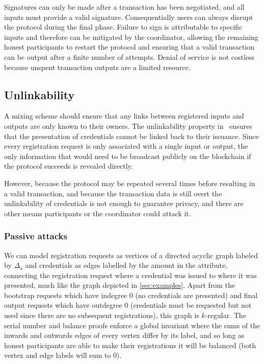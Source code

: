 \documentclass[a4paper]{article}
\begin{document}
Signatures can only be made after a transaction has been negotiated, and all inputs must provide a valid signature. Consequentially users can always disrupt the protocol during the final phase. Failure to sign is attributable to specific inputs and therefore can be mitigated by the coordinator, allowing the remaining honest participants to restart the protocol and ensuring that a valid transaction can be output after a finite number of attempts. Denial of service is not costless because unspent transaction outputs are a limited resource.

\subsection{Unlinkability}

A mixing scheme should ensure that any links between registered inputs and outputs are only known to their owners. The unlinkability property in~\cite{chase2019signal} ensures that the presentation of credentials cannot be linked back to their issuance. Since every registration request is only associated with a single input or output, the only information that would need to be broadcast publicly on the blockchain if the protocol succeeds is revealed directly.

However, because the protocol may be repeated several times before resulting in a valid transaction, and because the transaction data is still overt the unlinkability of credentials is not enough to guarantee privacy, and there are other means participants or the coordinator could attack it.

\subsubsection{Passive attacks}

We can model registration requests as vertices of a directed acyclic graph labeled by $\Delta_a$ and credentials as edges labelled by the amount in the attribute, connecting the registration request where a credential was issued to where it was presented, much like the graph depicted in \cref{sec:examples}. Apart from the bootstrap requests which have indegree 0 (no credentials are presented) and final output requests which have outdegree 0 (credentials must be requested but not used since there are no subsequent registrations), this graph is $k$-regular. The serial number and balance proofs enforce a global invariant where the sums of the inwards and outwards edges of every vertex differ by its label, and so long as honest participants are able to make their registrations it will be balanced (both vertex and edge labels will sum to 0).
\end{document}
